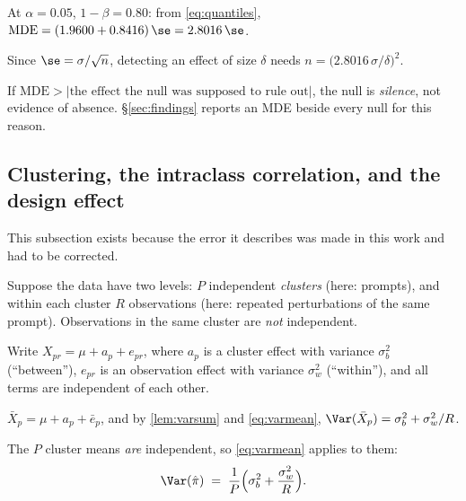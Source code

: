 \begin{corollary}
At $\alpha = 0.05$, $1-\beta = 0.80$: from \cref{eq:quantiles},
$\mathrm{MDE} = (1.9600+0.8416)\,\se = 2.8016\,\se$.
\end{corollary}

\begin{corollary}
\label{cor:n}
Since $\se = \sigma/\sqrt n$, detecting an effect of size $\delta$ needs
$n = \big(2.8016\,\sigma/\delta\big)^2$.
\end{corollary}

\begin{remark}
If $\mathrm{MDE} > |\text{the effect the null was supposed to rule out}|$, the
null is \emph{silence}, not evidence of absence. §\ref{sec:findings} reports an
MDE beside every null for this reason.
\end{remark}

\subsection{Clustering, the intraclass correlation, and the design effect}
\label{sec:cluster}

This subsection exists because the error it describes was made in this work and
had to be corrected.

 Suppose the data have two levels: $P$ independent
\emph{clusters} (here: prompts), and within each cluster $R$ observations (here:
repeated perturbations of the same prompt). Observations in the same cluster are
\emph{not} independent.

 Write
$X_{pr} = \mu + a_p + e_{pr}$, where $a_p$ is a cluster effect with variance
$\sigma_b^2$ (``between''), $e_{pr}$ is an observation effect with variance
$\sigma_w^2$ (``within''), and all terms are independent of each other.

 $\bar X_p = \mu + a_p + \bar e_p$,
and by \cref{lem:varsum} and \cref{eq:varmean},
$\Var(\bar X_p) = \sigma_b^2 + \sigma_w^2/R$.

 The $P$ cluster means \emph{are}
independent, so \cref{eq:varmean} applies to them:
\begin{equation}
\Var(\hat\pi) \;=\; \frac{1}{P}\Big(\sigma_b^2 + \frac{\sigma_w^2}{R}\Big).
\label{eq:varclust}
\end{equation}

